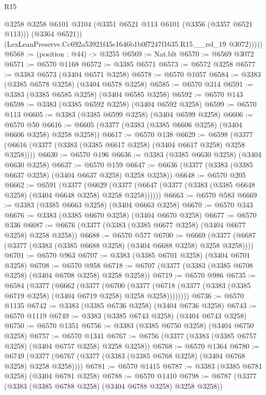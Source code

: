 \begin{lexlean}{R15}
\begin{coremodule}
              @3258
              @3258
              @6101
              @3104
              (@3351 @6521 @113 @6101 (@3356 (@3357 @6521 @113)))
              (@3364 @6521))
            (LexLeanPreserve.Cc692a53921f45e1646b1b0f7247f1635.R15.__rel_19 @3072)))))
@6568 := (position : @44) -> @3255
@6569 := Nat.blt
@6570 := @6569 @3072
@6571 := @6570 @1168
@6572 := @3385 @6571
@6573 := @6572 @3258
@6577 := @3383 @6573 (@3404 @6571 @3258)
@6578 := @6570 @1057
@6584 := @3383 (@3385 @6578 @3258) (@3404 @6578 @3258)
@6585 := @6570 @314
@6591 := @3383 (@3385 @6585 @3258) (@3404 @6585 @3258)
@6592 := @6570 @143
@6598 := @3383 (@3385 @6592 @3258) (@3404 @6592 @3258)
@6599 := @6570 @113
@6605 := @3383 (@3385 @6599 @3258) (@3404 @6599 @3258)
@6606 := @6570 @50
@6616 := @6605 (@3377 (@3383 (@3385 @6606 @3258) (@3404 @6606 @3258) @3258 @3258))
@6617 := @6570 @138
@6629 := @6598 (@3377 (@6616 (@3377 (@3383 (@3385 @6617 @3258) (@3404 @6617 @3258) @3258 @3258))))
@6630 := @6570 @196
@6636 := @3383 (@3385 @6630 @3258) (@3404 @6630 @3258)
@6637 := @6570 @159
@6647 := @6636 (@3377 (@3383 (@3385 @6637 @3258) (@3404 @6637 @3258) @3258 @3258))
@6648 := @6570 @205
@6662 := @6591
    (@3377
      (@6629 (@3377 (@6647 (@3377 (@3383 (@3385 @6648 @3258) (@3404 @6648 @3258) @3258 @3258))))))
@6663 := @6570 @583
@6669 := @3383 (@3385 @6663 @3258) (@3404 @6663 @3258)
@6670 := @6570 @343
@6676 := @3383 (@3385 @6670 @3258) (@3404 @6670 @3258)
@6677 := @6570 @336
@6687 := @6676 (@3377 (@3383 (@3385 @6677 @3258) (@3404 @6677 @3258) @3258 @3258))
@6688 := @6570 @577
@6700 := @6669 (@3377 (@6687 (@3377 (@3383 (@3385 @6688 @3258) (@3404 @6688 @3258) @3258 @3258))))
@6701 := @6570 @963
@6707 := @3383 (@3385 @6701 @3258) (@3404 @6701 @3258)
@6708 := @6570 @958
@6718 := @6707 (@3377 (@3383 (@3385 @6708 @3258) (@3404 @6708 @3258) @3258 @3258))
@6719 := @6570 @986
@6735 := @6584
    (@3377
      (@6662
        (@3377
          (@6700
            (@3377 (@6718 (@3377 (@3383 (@3385 @6719 @3258) (@3404 @6719 @3258) @3258 @3258))))))))
@6736 := @6570 @1135
@6742 := @3383 (@3385 @6736 @3258) (@3404 @6736 @3258)
@6743 := @6570 @1119
@6749 := @3383 (@3385 @6743 @3258) (@3404 @6743 @3258)
@6750 := @6570 @1351
@6756 := @3383 (@3385 @6750 @3258) (@3404 @6750 @3258)
@6757 := @6570 @1341
@6767 := @6756 (@3377 (@3383 (@3385 @6757 @3258) (@3404 @6757 @3258) @3258 @3258))
@6768 := @6570 @1364
@6780 := @6749 (@3377 (@6767 (@3377 (@3383 (@3385 @6768 @3258) (@3404 @6768 @3258) @3258 @3258))))
@6781 := @6570 @1415
@6787 := @3383 (@3385 @6781 @3258) (@3404 @6781 @3258)
@6788 := @6570 @1410
@6798 := @6787 (@3377 (@3383 (@3385 @6788 @3258) (@3404 @6788 @3258) @3258 @3258))

\end{coremodule}
\end{lexlean}
